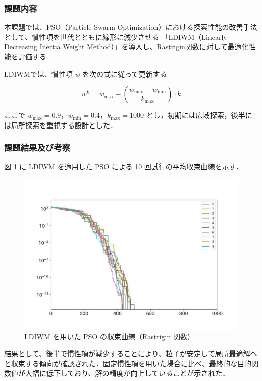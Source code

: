 \subsubsection{課題内容}

本課題では、PSO（Particle Swarm Optimization）における探索性能の改善手法として、慣性項を世代とともに線形に減少させる
「LDIWM（Linearly Decreasing Inertia Weight Method）」を導入し、Rastrigin関数に対して最適化性能を評価する.\cite{LDIWM_sciencedirect} 

LDIWMでは、慣性項 \( w \) を次の式に従って更新する

\[
w^k = w_{\max} - \left( \frac{w_{\max} - w_{\min}}{k_{\max}} \right) \cdot k
\]

ここで \( w_{\max} = 0.9 \)，\( w_{\min} = 0.4 \)，\( k_{\max} = 1000 \) とし，初期には広域探索，後半には局所探索を重視する設計とした．

\subsubsection{課題結果及び考察}

図 \ref{fig:kadai4} に LDIWM を適用した PSO による 10 回試行の平均収束曲線を示す．

\begin{figure}[H]
  \centering
  \includegraphics[width=0.8\linewidth]{figure/kadai5_result_graph_fixed.pdf}
  \caption{LDIWM を用いた PSO の収束曲線（Rastrigin 関数）}
  \label{fig:kadai4}
\end{figure}

結果として、後半で慣性項が減少することにより、粒子が安定して局所最適解へと収束する傾向が確認された．固定慣性項を用いた場合に比べ、最終的な目的関数値が大幅に低下しており、解の精度が向上していることが示された．


